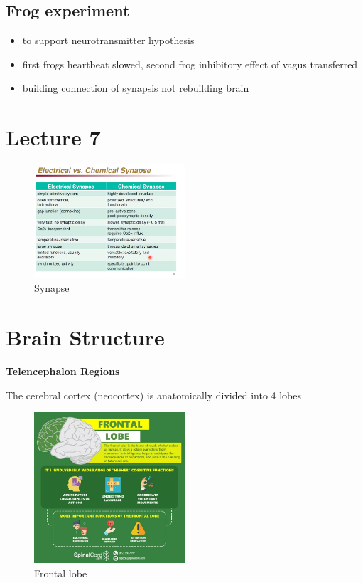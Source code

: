 \documentclass{article}
\begin{document}
\subsection*{Frog experiment}

\begin{itemize}
    \item to support neurotransmitter hypothesis
    \item first frogs heartbeat slowed, second frog inhibitory effect of vagus transferred
    \item building connection of synapsis not rebuilding brain
\end{itemize}

\section*{Lecture 7}

\begin{figure}[h]
\centering
\includegraphics[width=0.5\textwidth]{assets/synapse.png}
\caption{Synapse}
\end{figure}

\section*{Brain Structure}

\noindent \textbf{Telencephalon Regions}

The cerebral cortex (neocortex) is anatomically divided into 4 lobes

\begin{figure}[h]
\centering
\includegraphics[width=0.5\textwidth]{assets/frontalLobe.png}
\caption{Frontal lobe}
\end{figure}
\end{document}

